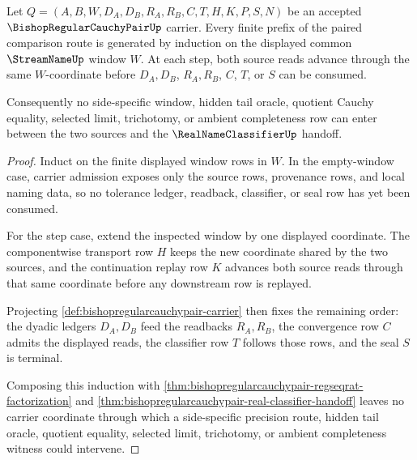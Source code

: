 \begin{theorem}
\label{thm:bishopregularcauchypair-common-window-induction}
Let $Q=(A,B,W,D_A,D_B,R_A,R_B,C,T,H,K,P,S,N)$ be an accepted $\BishopRegularCauchyPairUp$ carrier. Every finite prefix of the paired comparison route is generated by induction on the displayed common $\StreamNameUp$ window $W$. At each step, both source reads advance through the same $W$-coordinate before $D_A,D_B$, $R_A,R_B$, $C$, $T$, or $S$ can be consumed.

Consequently no side-specific window, hidden tail oracle, quotient Cauchy equality, selected limit, trichotomy, or ambient completeness row can enter between the two sources and the $\RealNameClassifierUp$ handoff.
\end{theorem}
\begin{proof}
Induct on the finite displayed window rows in $W$. In the empty-window case, carrier admission exposes only the source rows, provenance rows, and local naming data, so no tolerance ledger, readback, classifier, or seal row has yet been consumed.

For the step case, extend the inspected window by one displayed coordinate. The componentwise transport row $H$ keeps the new coordinate shared by the two sources, and the continuation replay row $K$ advances both source reads through that same coordinate before any downstream row is replayed.

Projecting \autoref{def:bishopregularcauchypair-carrier} then fixes the remaining order: the dyadic ledgers $D_A,D_B$ feed the readbacks $R_A,R_B$, the convergence row $C$ admits the displayed reads, the classifier row $T$ follows those rows, and the seal $S$ is terminal.

Composing this induction with \autoref{thm:bishopregularcauchypair-regseqrat-factorization} and \autoref{thm:bishopregularcauchypair-real-classifier-handoff} leaves no carrier coordinate through which a side-specific precision route, hidden tail oracle, quotient equality, selected limit, trichotomy, or ambient completeness witness could intervene.
\end{proof}

